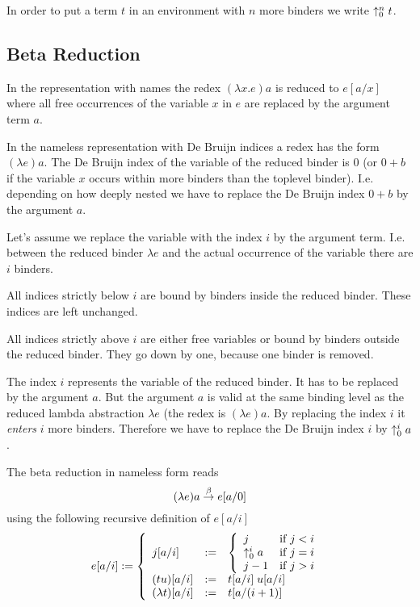 \documentclass[12pt]{article}
\begin{document}
In order to put a term $t$ in an environment with $n$ more binders we write
$\uparrow^n_0 t$.











\subsection{Beta Reduction}


In the representation with names the redex $(\lambda x. e) a$ is reduced to
$e[a/x]$ where all free occurrences of the variable $x$ in $e$ are replaced by
the argument term $a$.

In the nameless representation with De Bruijn indices a redex has the form
$(\lambda e) a$. The De Bruijn index of the variable of the reduced binder is
$0$ (or $0 + b$ if the variable $x$ occurs within more binders than the toplevel
binder). I.e. depending on how deeply nested we have to replace the De Bruijn
index $0 + b$ by the argument $a$.

Let's assume we replace the variable with the index $i$ by the argument term.
I.e. between the reduced binder $\lambda e$ and the actual occurrence of the
variable there are $i$ binders.

All indices strictly below $i$ are bound by binders inside the reduced binder.
These indices are left unchanged.

All indices strictly above $i$ are either free variables or bound by binders
outside the reduced binder. They go down by one, because one binder is removed.

The index $i$ represents the variable of the reduced binder. It has to be
replaced by the argument $a$. But the argument $a$ is valid at the same binding
level as the reduced lambda abstraction $\lambda e$ (the redex is $(\lambda e)
a$. By replacing the index $i$ it \emph{enters} $i$ more binders. Therefore we
have to replace the De Bruijn index $i$ by $\uparrow^i_0 a$.

The beta reduction in nameless form reads
$$
(\lambda e) a \stackrel{\beta}\to e[a/0]
$$
using the following recursive definition of $e[a/i]$
%
$$
e[a/i] :=
\left\{ \begin{array}{lllll} 
    j[a/i] &:=&
    \left\{ \begin{array}{lllll} 
        j & \text{if } j < i
        \\
        \uparrow^i_0 a & \text{if } j = i
        \\
        j - 1 & \text{if } j > i
     \end{array} \right.
    \\
    (t u)[a/i] & := & t[a/i]\; u[a/i]
    \\
    (\lambda t)[a/i] & := &
    t[a / (i + 1)]
 \end{array} \right.
$$
\end{document}
